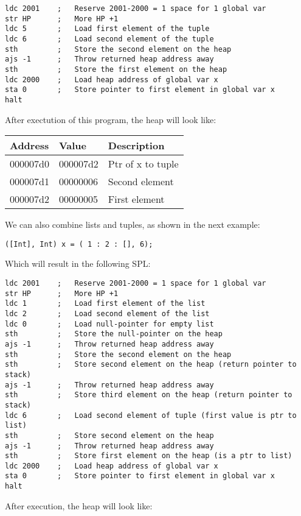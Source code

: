 \documentclass[a4paper]{article}
\begin{document}
\begin{lstlisting}
ldc 2001	;	Reserve 2001-2000 = 1 space for 1 global var
str HP		;	More HP +1
ldc 5		;	Load first element of the tuple
ldc 6		;	Load second element of the tuple
sth			;	Store the second element on the heap
ajs -1		;	Throw returned heap address away
sth			;	Store the first element on the heap
ldc 2000	;	Load heap address of global var x
sta 0		;	Store pointer to first element in global var x
halt
\end{lstlisting}
After exectution of this program, the heap will look like:

\begin{tabular}{|l|l|l|}
	\hline
	Address & Value & Description \\
	\hline
	000007d0 & 000007d2 & Ptr of x to tuple \\
	000007d1 & 00000006 & Second element  \\
	000007d2 & 00000005 & First element  \\
	\hline
\end{tabular}

We can also combine lists and tuples, as shown in the next example: 
\begin{lstlisting}
([Int], Int) x = ( 1 : 2 : [], 6);
\end{lstlisting}

Which will result in the following SPL:
\begin{lstlisting}
ldc 2001	;	Reserve 2001-2000 = 1 space for 1 global var
str HP		;	More HP +1
ldc 1		;	Load first element of the list
ldc 2		;	Load second element of the list
ldc 0		;	Load null-pointer for empty list
sth			;	Store the null-pointer on the heap
ajs -1		;	Throw returned heap address away
sth			;	Store the second element on the heap
sth			;	Store second element on the heap (return pointer to stack)
ajs -1		;	Throw returned heap address away
sth			;	Store third element on the heap (return pointer to stack)
ldc 6		;	Load second element of tuple (first value is ptr to list)
sth			;	Store second element on the heap
ajs -1		;	Throw returned heap address away
sth			;	Store first element on the heap (is a ptr to list)
ldc 2000	;	Load heap address of global var x
sta 0		;	Store pointer to first element in global var x
halt
\end{lstlisting}

After execution, the heap will look like:
\end{document}
